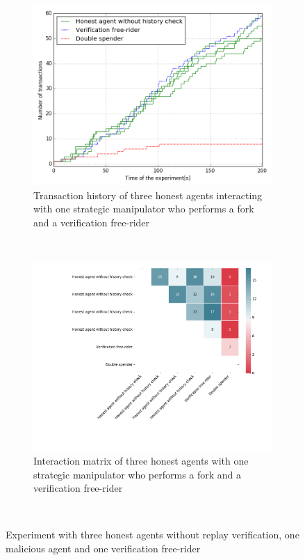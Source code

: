\begin{figure}[h!]
    \begin{subfigure}{\textwidth}
      \centering
      \includegraphics[width=.7\linewidth]{images/verification_doublespend_honest}
      \caption{Transaction history of three honest agents interacting with one strategic manipulator who performs a fork and a verification free-rider}
      \label{fig:verification_doublespend_honest}
    \end{subfigure}\\
    \begin{subfigure}{\textwidth}
      \centering
      \includegraphics[width=1\textwidth]{images/verification_doublespend_honest_matrix}
      \caption{Interaction matrix of three honest agents with one strategic manipulator who performs a fork and a verification free-rider}
      \label{fig:verification_doublespend_honest_matrix}
    \end{subfigure}\\
    \caption{Experiment with three honest agents without replay verification, one malicious agent 
    and one verification free-rider}
    \label{fig:verification_doublespend_honest_combined}
\end{figure}


